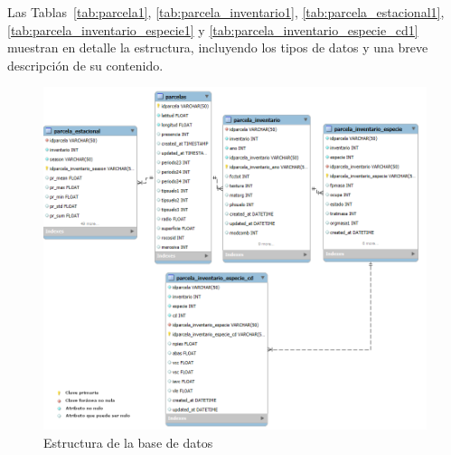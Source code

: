 Las Tablas~\ref{tab:parcela1}, \ref{tab:parcela_inventario1}, \ref{tab:parcela_estacional1}, \ref{tab:parcela_inventario_especie1} y \ref{tab:parcela_inventario_especie_cd1} muestran en detalle la estructura, incluyendo los tipos de datos y una breve descripción de su contenido.


\begin{figure}[H]
    \centering
    \includegraphics[width=1\linewidth]{figuras/estructura_base_datos_informe_con_leyenda.png}
    \caption{Estructura de la base de datos}
    \label{fig:estructura_ddbb}
\end{figure}



